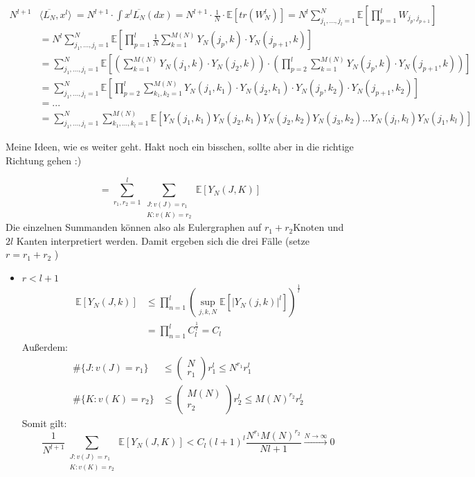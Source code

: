 \documentclass[a4paper, 11pt]{scrreprt}
\newenvironment{beweis}[1][Beweis]{\begin{trivlist}
	\item[\hskip \labelsep {\bfseries #1}]}
	{\end{trivlist}}
\newcommand{\EE}{\mathbb{E}}
\begin{document}
\newpage
\begin{beweis}
\begin{align*}
		N^{l+1} &\langle \overline{L_N}, x^l \rangle\ 
		= N^{l+1} \cdot \int x^l \overline{L_N}(dx) 
		= N^{l+1} \cdot \frac{1}{N} \cdot \EE[tr(W^l_N)] 
		= N^l \sum_{j_1,...,j_l = 1}^N \EE\left[\prod_{p = 1}^l W_{j_p,j_{p+1}}\right] \\
		&= N^l \sum_{j_1,...,j_l = 1}^N \EE\left[\prod_{p = 1}^l \frac{1}{N} \sum_{k = 1}^{M(N)} Y_N(j_p,k) \cdot Y_N(j_{p+1},k) \right] \\
		&= \sum_{j_1,...,j_l = 1}^N \EE \left[\left(\sum_{k = 1}^{M(N)} Y_N(j_1,k) \cdot Y_N(j_2,k)\right) \cdot \left(\prod_{p = 2}^l \sum_{k = 1}^{M(N)} Y_N(j_p,k) \cdot Y_N(j_{p+1},k) \right) \right] \\
		&= \sum_{j_1,...,j_l = 1}^N \EE\left[	\prod_{p = 2}^l \sum_{k_1,k_2 = 1}^{M(N)} Y_N(j_1,k_1) \cdot Y_N(j_2,k_1) \cdot Y_N(j_p,k_2) \cdot Y_N(j_{p+1},k_2) \right] \\
		&= ... \\
		&= \sum_{j_1,...,j_l = 1}^N \sum_{k_1,...,k_l = 1}^{M(N)} \EE[Y_N(j_1,k_1) Y_N(j_2,k_1) Y_N(j_2,k_2) Y_N(j_3,k_2) ... Y_N(j_l,k_l) Y_N(j_1,k_l)]
\end{align*}

Meine Ideen, wie es weiter geht. Hakt noch ein bisschen, sollte aber in die richtige Richtung gehen :)

\begin{equation}
 = \sum_{r_1,r_2 = 1}^l \sum_{\substack{J:v(J)=r_1\\ K:v(K)=r_2 }} \EE[Y_N(J,K)]
\end{equation}
Die einzelnen Summanden können also als Eulergraphen auf \(r_1+r_2 \)Knoten und \(2l\) Kanten interpretiert werden.
Damit ergeben sich die drei Fälle (setze \(r = r_1+r_2\) )
\begin{itemize}
	\item \(r < l+ 1\)\\
		\begin{align*}
			\EE[Y_N(J,k)] &\leq \prod_{n=1}^l \left(\sup_{j,k,N}\EE\left[|Y_N(j,k)|^l\right]\right)^{\frac 1 l} \\
			& = \prod_{n=1}^l C_l^{\frac 1 l} = C_l
			\end{align*}
	Außerdem: 
		\begin{align*}
			\#\{J: v(J)=r_1\} &\leq \begin{pmatrix} N \\ r_1 \end{pmatrix} r_1^l \leq N^{r_1}r_1^l \\
			\#\{K: v(K)=r_2\} &\leq \begin{pmatrix} M(N) \\ r_2 \end{pmatrix} r_2^l \leq M(N)^{r_2}r_2^l
		\end{align*}
	Somit gilt: 
		\[\frac {1}{N^{l+1}} \sum_{\substack{J:v(J)=r_1\\ K:v(K)=r_2 }} \EE[Y_N(J,K)] < C_l (l+1)^l \frac{N^{r_1} M(N)^{r_2}}{N{l+1}} \xrightarrow{N\to\infty} 0\]
		

\end{itemize}
\end{beweis}
\end{document}
